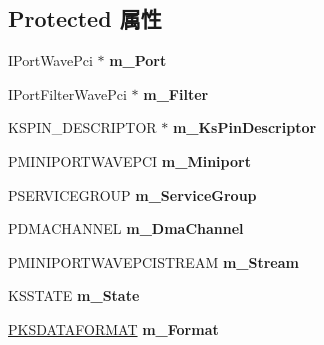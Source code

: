 \subsection*{Protected 属性}
\begin{DoxyCompactItemize}
\item 
\mbox{\label{class_c_port_pin_wave_pci_af7b2e8893af893c58bad48c80f443ca7}} 
I\+Port\+Wave\+Pci $\ast$ {\bfseries m\+\_\+\+Port}
\item 
\mbox{\label{class_c_port_pin_wave_pci_a22ca7350e4a1eec145c8940a560ce790}} 
I\+Port\+Filter\+Wave\+Pci $\ast$ {\bfseries m\+\_\+\+Filter}
\item 
\mbox{\label{class_c_port_pin_wave_pci_a126ae87887c5808524dfa72ed4521989}} 
K\+S\+P\+I\+N\+\_\+\+D\+E\+S\+C\+R\+I\+P\+T\+OR $\ast$ {\bfseries m\+\_\+\+Ks\+Pin\+Descriptor}
\item 
\mbox{\label{class_c_port_pin_wave_pci_ade4fc375240811b1ccbd4f6e3fd7a645}} 
P\+M\+I\+N\+I\+P\+O\+R\+T\+W\+A\+V\+E\+P\+CI {\bfseries m\+\_\+\+Miniport}
\item 
\mbox{\label{class_c_port_pin_wave_pci_a7cf6db58659ec6902bfb4ef1a6915443}} 
P\+S\+E\+R\+V\+I\+C\+E\+G\+R\+O\+UP {\bfseries m\+\_\+\+Service\+Group}
\item 
\mbox{\label{class_c_port_pin_wave_pci_a77fe4862d4782e561a562bcda0defa9e}} 
P\+D\+M\+A\+C\+H\+A\+N\+N\+EL {\bfseries m\+\_\+\+Dma\+Channel}
\item 
\mbox{\label{class_c_port_pin_wave_pci_a85dd1cde0d0c53958460762794fc6f1c}} 
P\+M\+I\+N\+I\+P\+O\+R\+T\+W\+A\+V\+E\+P\+C\+I\+S\+T\+R\+E\+AM {\bfseries m\+\_\+\+Stream}
\item 
\mbox{\label{class_c_port_pin_wave_pci_a86c30c40300e3f4bc91173ba6d28fd10}} 
K\+S\+S\+T\+A\+TE {\bfseries m\+\_\+\+State}
\item 
\mbox{\label{class_c_port_pin_wave_pci_af2d049127bccfd460904d67cb58fe5a3}} 
\hyperlink{struct_k_s_d_a_t_a_f_o_r_m_a_t}{P\+K\+S\+D\+A\+T\+A\+F\+O\+R\+M\+AT} {\bfseries m\+\_\+\+Format}

\end{DoxyCompactItemize}
